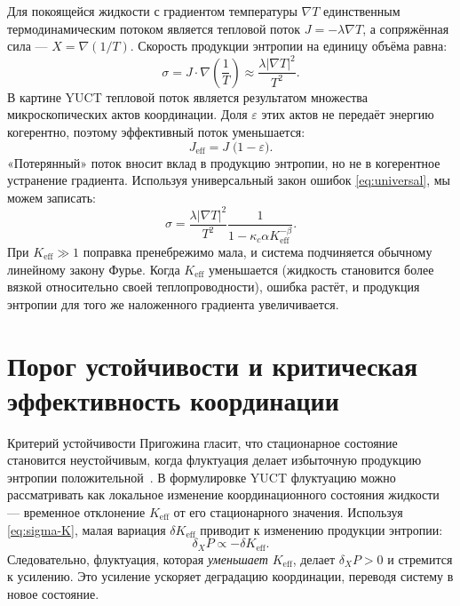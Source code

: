 \documentclass[12pt,a4paper]{article}
\begin{document}
	Для покоящейся жидкости с градиентом температуры \(\nabla T\) единственным термодинамическим потоком является тепловой поток \(J = -\lambda \nabla T\), а сопряжённая сила — \(X = \nabla(1/T)\). Скорость продукции энтропии на единицу объёма равна:
	\begin{equation}\label{eq:sigma}
		\sigma = J \cdot \nabla\left(\frac{1}{T}\right) \approx \frac{\lambda |\nabla T|^2}{T^2}.
	\end{equation}
	В картине YUCT тепловой поток является результатом множества микроскопических актов координации. Доля \(\varepsilon\) этих актов не передаёт энергию когерентно, поэтому эффективный поток уменьшается:
	\begin{equation}\label{eq:J-effective}
		J_{\mathrm{eff}} = J \; \bigl(1 - \varepsilon\bigr).
	\end{equation}
	«Потерянный» поток вносит вклад в продукцию энтропии, но не в когерентное устранение градиента. Используя универсальный закон ошибок \eqref{eq:universal}, мы можем записать:
	\begin{equation}\label{eq:sigma-K}
		\sigma = \frac{\lambda |\nabla T|^2}{T^2} \frac{1}{1 - \kappa_c\alpha K_{\mathrm{eff}}^{-\beta}}.
	\end{equation}
	При \(K_{\mathrm{eff}} \gg 1\) поправка пренебрежимо мала, и система подчиняется обычному линейному закону Фурье. Когда \(K_{\mathrm{eff}}\) уменьшается (жидкость становится более вязкой относительно своей теплопроводности), ошибка растёт, и продукция энтропии для того же наложенного градиента увеличивается.
	
	\section{Порог устойчивости и критическая эффективность координации}
	
	Критерий устойчивости Пригожина гласит, что стационарное состояние становится неустойчивым, когда флуктуация делает избыточную продукцию энтропии положительной~\cite{Glansdorff1971}. В формулировке YUCT флуктуацию можно рассматривать как локальное изменение координационного состояния жидкости — временное отклонение \(K_{\mathrm{eff}}\) от его стационарного значения. Используя \eqref{eq:sigma-K}, малая вариация \(\delta K_{\mathrm{eff}}\) приводит к изменению продукции энтропии:
	\begin{equation}
		\delta_X P \propto - \delta K_{\mathrm{eff}}.
	\end{equation}
	Следовательно, флуктуация, которая \emph{уменьшает} \(K_{\mathrm{eff}}\), делает \(\delta_X P > 0\) и стремится к усилению. Это усиление ускоряет деградацию координации, переводя систему в новое состояние.
	
\end{document}
